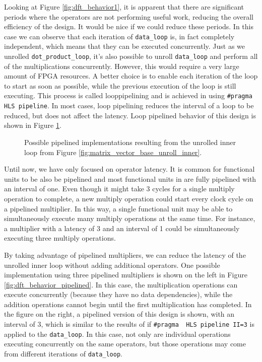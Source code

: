 Looking at Figure \ref{fig:dft_behavior1}, it is apparent that there are significant periods where the operators are not performing useful work, reducing the overall efficiency of the design.  It would be nice if we could reduce these periods.  In this case we can observe that each iteration of \lstinline|data_loop| is, in fact completely independent, which means that they can be executed concurrently.  Just as we unrolled \lstinline{dot_product_loop}, it's also possible to unroll \lstinline{data_loop} and perform all of the multiplications concurrently.  However, this would require a very large amount of FPGA resources.  A better choice is to enable each iteration of the loop to start as soon as possible, while the previous execution of the loop is still executing.  This process is called \gls{looppipelining} and is achieved in \VHLS using \lstinline|#pragma HLS pipeline|.  In most cases, loop pipelining reduces the interval of a loop to be reduced, but does not affect the latency.  Loop pipelined behavior of this design is shown in Figure \ref{fig:dft_behavior2}. 

\begin{figure}
\begin{tiny}
\centering

\end{tiny}
\caption{Possible pipelined implementations resulting from the unrolled inner loop from Figure \ref{fig:matrix_vector_base_unroll_inner}.}\label{fig:dft_behavior2}
\end{figure}

Until now, we have only focused on operator latency.  It is common for functional units to be also be pipelined and most functional units in \VHLS are fully pipelined with an interval of one. Even though it might take 3 cycles for a single multiply operation to complete, a new multiply operation could start every clock cycle on a pipelined multiplier.  In this way, a single functional unit may be able to simultaneously execute many multiply operations at the same time.  For instance, a multiplier with a latency of 3 and an interval of 1 could be simultaneously executing three multiply operations. 

By taking advantage of pipelined multipliers, we can reduce the latency of the unrolled inner loop without adding additional operators.  One possible implementation using three pipelined multipliers is shown on the left in Figure \ref{fig:dft_behavior_pipelined}.  In this case, the multiplication operations can execute concurrently (because they have no data dependencies), while the addition operations cannot begin until the first multiplication has completed.  In the figure on the right, a pipelined version of this design is shown, with an interval of 3, which is similar to the results of \VHLS if \lstinline|#pragma  HLS pipeline II=3| is applied to the \lstinline|data_loop|.  In this case, not only are individual operations executing concurrently on the same operators, but those operations may come from different iterations of \lstinline|data_loop|.  

